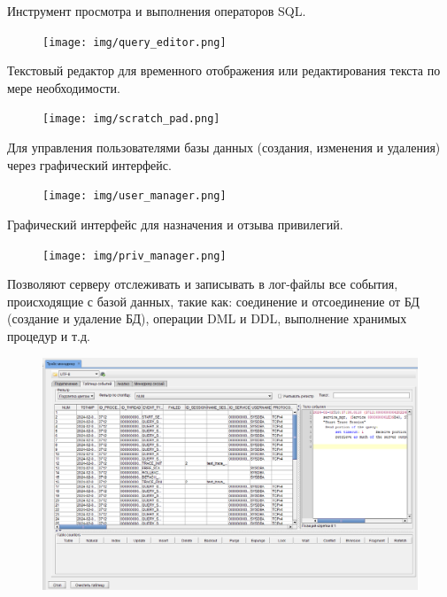 Инструмент просмотра и выполнения операторов SQL.
	\begin{figure}[H]
		\centering
		\texttt{[image: img/query\_editor.png]}
	\end{figure}


Текстовый редактор для временного отображения или редактирования текста по мере необходимости.
	\begin{figure}[H]
		\centering
		\texttt{[image: img/scratch\_pad.png]}
	\end{figure}


Для управления пользователями базы данных (создания, изменения и удаления) через графический интерфейс.
	
	\begin{figure}[H]
		\centering
		\texttt{[image: img/user\_manager.png]}
	\end{figure}


Графический интерфейс для назначения и отзыва привилегий.
	\begin{figure}[H]
		\centering
		\texttt{[image: img/priv\_manager.png]}
	\end{figure}


Позволяют серверу отслеживать и записывать в лог-файлы все события, происходящие с базой данных, такие как: соединение и отсоединение от БД (создание и удаление БД), операции DML и DDL, выполнение хранимых процедур и т.д.
	\begin{figure}[H]
		\centering
		\includegraphics[width = 0.8\linewidth]{img/trace_manager.png}
	\end{figure}

